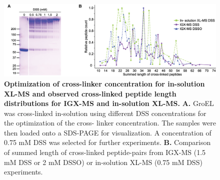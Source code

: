 \begin{subappendices}
    \clearpage

    \begin{figure}[hbt!]
        \center
        \includegraphics[width=\textwidth]{Chapter.2/Figures/SI_Fig3.png} 
        \caption{\textbf{Optimization of cross-linker concentration for in-solution XL-MS and observed cross-linked peptide length distributions for IGX-MS and in-solution XL-MS.} \textbf{A.} GroEL was cross-linked in-solution using different DSS concentrations for the optimization of the cross- linker concentration. The samples were then loaded onto a SDS-PAGE for visualization. A concentration of
        0.75 mM DSS was selected for further experiments. \textbf{B.} Comparison of summed length of cross-linked peptide-pairs from IGX-MS (1.5 mM DSS or 2 mM DSSO) or in-solution XL-MS (0.75 mM DSS) experiments.}
        \label{fig:ch2_app_fig3}
    \end{figure}


\end{subappendices}

